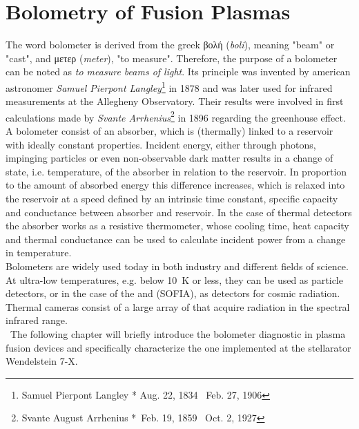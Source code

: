 %
\chapter{Bolometry of Fusion Plasmas}\label{chap:bolometry}%
%
    The word bolometer is derived from the greek \textgreek{βολή} (\textit{boli}), meaning "beam" or "cast", and \textgreek{μετερ} (\textit{meter}), "to measure". Therefore, the purpose of a bolometer can be noted as \textit{to measure beams of light}. Its principle was invented by american astronomer \textit{Samuel Pierpont Langley}\footnote[1]{Samuel Pierpont Langley * Aug. 22, 1834 \textdagger~Feb. 27, 1906} in 1878 and was later used for infrared measurements at the Allegheny Observatory\cite{Langley1880,Langley1881}. Their results were involved in first calculations made by \textit{Svante Arrhenius}\footnote[2]{Svante August Arrhenius *~Feb. 19, 1859 \textdagger~Oct. 2, 1927} in 1896 regarding the greenhouse effect\cite{Arrhenius1896}.\\%
%
    \newline%
    A bolometer consist of an absorber, which is (thermally) linked to a reservoir with ideally constant properties. Incident energy, either through photons, impinging particles or even non-observable dark matter results in a change of state, i.e. temperature, of the absorber in relation to the reservoir. In proportion to the amount of absorbed energy this difference increases, which is relaxed into the reservoir at a speed defined by an intrinsic time constant, specific capacity and conductance between absorber and reservoir. In the case of thermal detectors the absorber works as a resistive thermometer, whose cooling time, heat capacity and thermal conductance can be used to calculate incident power from a change in temperature.\\%
    Bolometers are widely used today in both industry and different fields of science. At ultra-low temperatures, e.g. below \SI{10}{\kelvin} or less, they can be used as particle detectors, or in the case of the \cite{Gildemeister1999} and  (SOFIA), as detectors for cosmic radiation.\cite{Huebers2000} Thermal cameras consist of a large array of  that acquire radiation in the spectral infrared range\cite{Kumar2003}.\\%
    \,\newline%
    The following chapter will briefly introduce the bolometer diagnostic in plasma fusion devices and specifically characterize the one implemented at the stellarator Wendelstein 7-X.%
%
